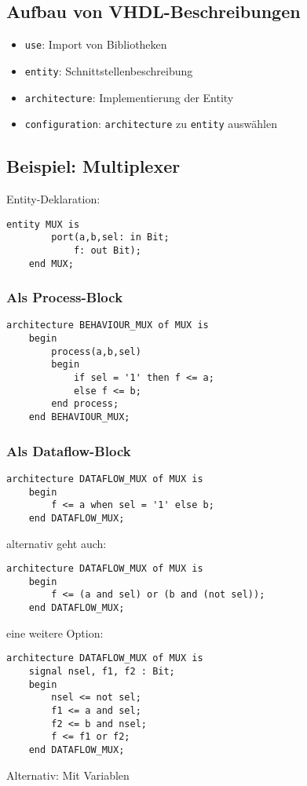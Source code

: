 \subsection{Aufbau von VHDL-Beschreibungen}
\begin{itemize}
    \item \lstinline[style=vhdl]{use}: Import von Bibliotheken
    \item \lstinline[style=vhdl]{entity}: Schnittstellenbeschreibung
    \item \lstinline[style=vhdl]{architecture}: Implementierung der Entity
    \item \lstinline[style=vhdl]{configuration}: \lstinline[style=vhdl]{architecture} zu \lstinline[style=vhdl]{entity} auswählen
\end{itemize}

\subsection{Beispiel: Multiplexer}
Entity-Deklaration:
\begin{lstlisting}[style=vhdl]
    entity MUX is
        port(a,b,sel: in Bit;
            f: out Bit);
    end MUX;
\end{lstlisting}

\subsubsection{Als Process-Block}
\begin{lstlisting}[style=vhdl]
    architecture BEHAVIOUR_MUX of MUX is
    begin
        process(a,b,sel)
        begin
            if sel = '1' then f <= a;
            else f <= b;
        end process;
    end BEHAVIOUR_MUX;
\end{lstlisting}

\subsubsection{Als Dataflow-Block}
\begin{lstlisting}[style=vhdl]
    architecture DATAFLOW_MUX of MUX is
    begin
        f <= a when sel = '1' else b;
    end DATAFLOW_MUX;
\end{lstlisting}
alternativ geht auch:
\begin{lstlisting}[style=vhdl]
    architecture DATAFLOW_MUX of MUX is
    begin
        f <= (a and sel) or (b and (not sel));
    end DATAFLOW_MUX;
\end{lstlisting}
eine weitere Option:

\begin{lstlisting}[style=vhdl]
    architecture DATAFLOW_MUX of MUX is
    signal nsel, f1, f2 : Bit;
    begin
        nsel <= not sel;
        f1 <= a and sel;
        f2 <= b and nsel;
        f <= f1 or f2;
    end DATAFLOW_MUX;
\end{lstlisting}
Alternativ: Mit Variablen
